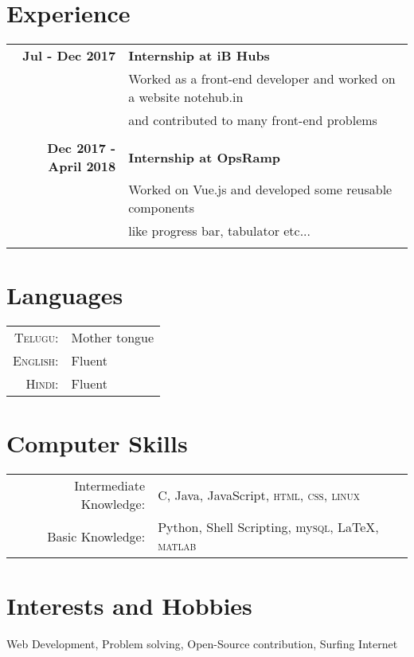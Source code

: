 \documentclass[a4paper, 10pt]{article}
\begin{document}
\par\vspace{\parskip}

\section{Experience}
\begin{tabular}{rl}

\textbf{Jul - Dec 2017} & \textbf{Internship at iB Hubs}\\
& Worked as a front-end developer and worked on a website notehub.in\\
& and contributed to many front-end problems\\&\\


\textbf{Dec 2017 - April 2018} & \textbf{Internship at OpsRamp}\\
& Worked on Vue.js and developed some reusable components\\
& like progress bar, tabulator etc...\\ & \\

\end{tabular}

\par\vspace{\parskip}

\section{Languages}
\begin{tabular}{rl}
	\textsc{Telugu:} & Mother tongue\\
	\textsc{English:} & Fluent\\
	\textsc{Hindi:} & Fluent\\
\end{tabular}

\par\vspace{\parskip}

\section{Computer Skills}
\begin{tabular}{rl}
	Intermediate Knowledge: & \textsc{C}, Java, JavaScript, \textsc{html}, \textsc{css}, \textsc{linux}\\
	Basic Knowledge: & Python, Shell Scripting, my\textsc{sql}, LaTeX, \textsc{matlab}
\end{tabular}

\par\vspace{\parskip}

\section{Interests and Hobbies}
Web Development, Problem solving, Open-Source contribution, Surfing Internet
\end{document}
